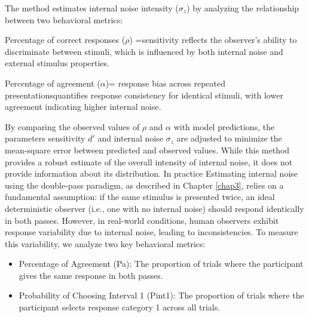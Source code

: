 The method estimates internal noise intensity ($\sigma_z$) by analyzing the relationship between two behavioral metrics:

Percentage of correct responses ($\rho$) =sensitivity  reflects the observer’s ability to discriminate between stimuli, which is influenced by both internal noise and external stimulus properties.


Percentage of agreement  ($\alpha$)= response bias across repeated presentationsquantifies response consistency for identical stimuli, with lower agreement indicating higher internal noise.


By comparing the observed values of $\rho$ and $\alpha$ with model predictions, the parameters sensitivity $d'$  and internal noise $\sigma_z$ are adjusted to minimize the mean-square error between predicted and observed values. While this method provides a robust estimate of the overall intensity of internal noise, it does not provide information about its distribution. \cite{neri_how_2010, neri_statistical_2013}
In practice 
Estimating internal noise using the double-pass paradigm, as described in Chapter \ref{chap3}, relies on a fundamental assumption: if the same stimulus is presented twice, an ideal deterministic observer (i.e., one with no internal noise) should respond identically in both passes. However, in real-world conditions, human observers exhibit response variability due to internal noise, leading to inconsistencies. To measure this variability, we analyze two key behavioral metrics:
\begin{itemize}
    \item Percentage of Agreement (Pa): The proportion of trials where the participant gives the same response in both passes.
    \item Probability of Choosing Interval 1 (Pint1): The proportion of trials where the participant selects response category 1 across all trials.
\end{itemize}

